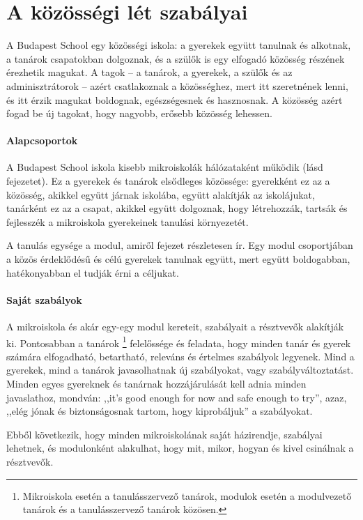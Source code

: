 \section{A közösségi lét szabályai}
\label{sec:kozossegi_elet}
A Budapest School egy közösségi iskola: a gyerekek együtt tanulnak és alkotnak, a tanárok csapatokban dolgoznak, és a szülők is egy elfogadó közösség részének érezhetik magukat. A tagok -- a tanárok, a gyerekek, a szülők és az adminisztrátorok -- azért csatlakoznak a közösséghez, mert itt szeretnének lenni, és itt érzik magukat boldognak, egészségesnek és hasznosnak. A közösség azért fogad be új tagokat, hogy nagyobb, erősebb közösség lehessen.

\paragraph{Alapcsoportok} A Budapest School iskola kisebb mikroiskolák
hálózataként működik (lásd  fejezetet). Ez a gyerekek és tanárok elsődleges közössége: gyerekként ez az a közösség, akikkel együtt járnak iskolába, együtt alakítják az iskolájukat, tanárként ez az a csapat, akikkel együtt dolgoznak, hogy létrehozzák, tartsák és fejlesszék a mikroiskola gyerekeinek tanulási környezetét.

A tanulás egysége a modul, amiről  fejezet részletesen ír. Egy modul csoportjában a közös érdeklődésű és célú gyerekek tanulnak együtt, mert együtt boldogabban, hatékonyabban el tudják érni a céljukat.

\paragraph{Saját szabályok}
\label{sec:sajat_szabalyok}
A mikroiskola és akár egy-egy modul kereteit, szabályait a résztvevők alakítják ki. Pontosabban a tanárok \footnote{Mikroiskola esetén a tanulásszervező tanárok, modulok esetén a modulvezető tanárok és a tanulásszervező tanárok közösen.} felelőssége és feladata, hogy minden tanár és gyerek számára elfogadható, betartható, releváns és értelmes szabályok legyenek. Mind a gyerekek, mind a tanárok javasolhatnak új szabályokat, vagy szabályváltoztatást. Minden egyes gyereknek és tanárnak hozzájárulását kell adnia minden javaslathoz, mondván: ,,it's good enough for now and safe enough to try'', azaz, ,,elég jónak és biztonságosnak tartom, hogy kiprobáljuk'' a szabályokat.

Ebből következik, hogy minden mikroiskolának saját házirendje, szabályai lehetnek, és modulonként alakulhat, hogy mit, mikor, hogyan és kivel csinálnak a résztvevők.

